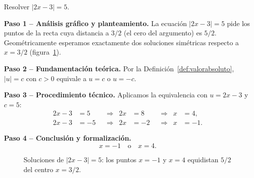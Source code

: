 \begin{example} Resolver $|2x - 3| = 5$.

\begin{myproof}
\textbf{Paso 1 – Análisis gráfico y planteamiento.}
La ecuación $|2x-3| = 5$ pide los puntos de la recta cuya distancia a $3/2$
(el cero del argumento) es $5/2$. Geométricamente esperamos exactamente dos
soluciones simétricas respecto a $x = 3/2$
(figura~\ref{fig:valabs_ecuacion}).

\textbf{Paso 2 – Fundamentación teórica.}
Por la Definición~\ref{def:valorabsoluto}, $|u| = c$ con $c > 0$ equivale a
$u = c$ o $u = -c$.

\textbf{Paso 3 – Procedimiento técnico.}
Aplicamos la equivalencia con $u = 2x-3$ y $c = 5$:
\begin{align*}
   2x - 3 &= 5 & &\Rightarrow & 2x &= 8 & &\Rightarrow & x &= 4,\\
   2x - 3 &= -5 & &\Rightarrow & 2x &= -2 & &\Rightarrow & x &= -1.
\end{align*}

\textbf{Paso 4 – Conclusión y formalización.}
\[
   \boxed{x = -1 \quad \text{o} \quad x = 4.}
\]

\begin{figure}[H]
\centering
{}
\caption{Soluciones de $|2x-3|=5$: los puntos $x=-1$ y $x=4$ equidistan
$5/2$ del centro $x=3/2$.}
\label{fig:valabs_ecuacion}
\end{figure}
\end{myproof}
\end{example}


